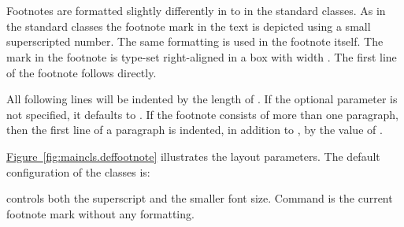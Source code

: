 \ifIgnoreThis %
\else %
\begin{Declaration}
                     \\
  \\
\end{Declaration}%
%
%
%
Footnotes are formatted slightly differently in {\KOMAScript} to in the
standard classes. As in the standard classes the footnote mark in the text is
depicted using a small superscripted number. The same formatting is used in
the footnote itself. The mark in the footnote is type-set right-aligned in a
box with width . The first line of the footnote follows
directly.

All following lines will be indented by the length of . If the
optional parameter  is not specified, it defaults to
.  If the footnote consists of more than one paragraph, then the
first line of a paragraph is indented, in addition to , by the
value of .

\hyperref[fig:maincls.deffootnote]{Figure~\ref*{fig:maincls.deffootnote}} %
%
illustrates the layout parameters. The default configuration of the
{\KOMAScript} classes is:
\begin{lstcode}
    {\textsuperscript{\thefootnotemark}}
\end{lstcode}
 controls both the superscript and the smaller
font size. Command  is the current footnote mark
without any formatting.%
%

